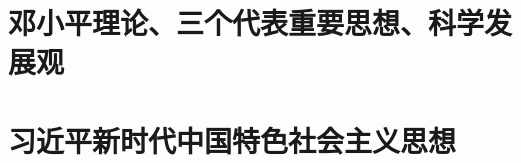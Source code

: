 \documentclass[oneside]{book}
\begin{document}
\begin{spacing}{1.2}
\part{邓小平理论、三个代表重要思想、科学发展观}




\part{习近平新时代中国特色社会主义思想}







\end{spacing}
\end{document}
